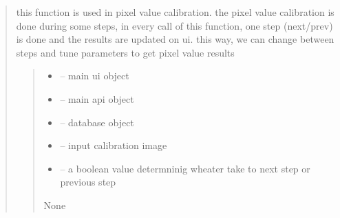 \documentclass[letterpaper,10pt,english]{sphinxmanual}
\begin{document}
\begin{quote}
\begin{savenotes}\begin{fulllineitems}
\label{\detokenize{setting/backend/pxvalue_calibration:oxin.backend.pxvalue_calibration.apply_pxvalue_calibration}}
\pysigstartsignatures
{}
\pysigstopsignatures
\sphinxAtStartPar
this function is used in pixel value calibration.
the pixel value calibration is done during some steps,
in every call of this function, one step (next/prev) is done and the results are updated on ui.
this way, we can change between steps and tune parameters to get pixel value results
\begin{quote}\begin{description}
\begin{itemize}
\item {} 
\sphinxAtStartPar
{} – main ui object

\item {} 
\sphinxAtStartPar
{} – main api object

\item {} 
\sphinxAtStartPar
{} – database object

\item {} 
\sphinxAtStartPar
{} – input calibration image

\item {} 
\sphinxAtStartPar
{} – a boolean value determninig wheater take to next step or previous step

\end{itemize}

\sphinxAtStartPar
None

\end{description}\end{quote}

\end{fulllineitems}\end{savenotes}



\end{quote}
\end{document}
